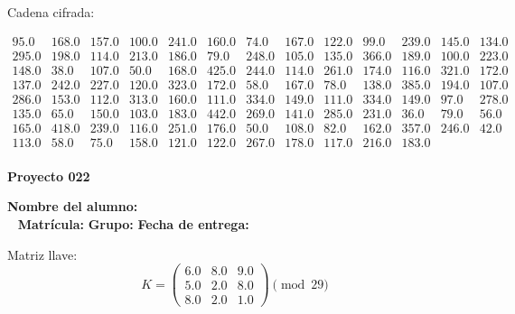 \documentclass[12pt]{article}
\begin{document}
Cadena cifrada:
\begin{center}
$\begin{array}{lllllllllllll}
95.0 & 168.0 & 157.0 & 100.0 & 241.0 & 160.0 & 74.0 & 167.0 & 122.0 & 99.0 & 239.0 & 145.0 & 134.0\\
295.0 & 198.0 & 114.0 & 213.0 & 186.0 & 79.0 & 248.0 & 105.0 & 135.0 & 366.0 & 189.0 & 100.0 & 223.0\\
148.0 & 38.0 & 107.0 & 50.0 & 168.0 & 425.0 & 244.0 & 114.0 & 261.0 & 174.0 & 116.0 & 321.0 & 172.0\\
137.0 & 242.0 & 227.0 & 120.0 & 323.0 & 172.0 & 58.0 & 167.0 & 78.0 & 138.0 & 385.0 & 194.0 & 107.0\\
286.0 & 153.0 & 112.0 & 313.0 & 160.0 & 111.0 & 334.0 & 149.0 & 111.0 & 334.0 & 149.0 & 97.0 & 278.0\\
135.0 & 65.0 & 150.0 & 103.0 & 183.0 & 442.0 & 269.0 & 141.0 & 285.0 & 231.0 & 36.0 & 79.0 & 56.0\\
165.0 & 418.0 & 239.0 & 116.0 & 251.0 & 176.0 & 50.0 & 108.0 & 82.0 & 162.0 & 357.0 & 246.0 & 42.0\\
113.0 & 58.0 & 75.0 & 158.0 & 121.0 & 122.0 & 267.0 & 178.0 & 117.0 & 216.0 & 183.0\\
\end{array}$
\end{center}

\newpage


\textbf{Proyecto 022}

\textbf{Nombre del alumno:} \underline{\hspace{13cm}}\\\
\vspace{1cm}
\textbf{Matrícula:} \underline{\hspace{4cm}} \hspace{1cm}
\textbf{Grupo:} \underline{\hspace{2cm}}
\textbf{Fecha de entrega:} \underline{\hspace{2cm}}

\medskip

Matriz llave:
\[
K = \begin{pmatrix}
6.0 & 8.0 & 9.0\\
5.0 & 2.0 & 8.0\\
8.0 & 2.0 & 1.0
\end{pmatrix} \pmod{29}
\]
\end{document}
